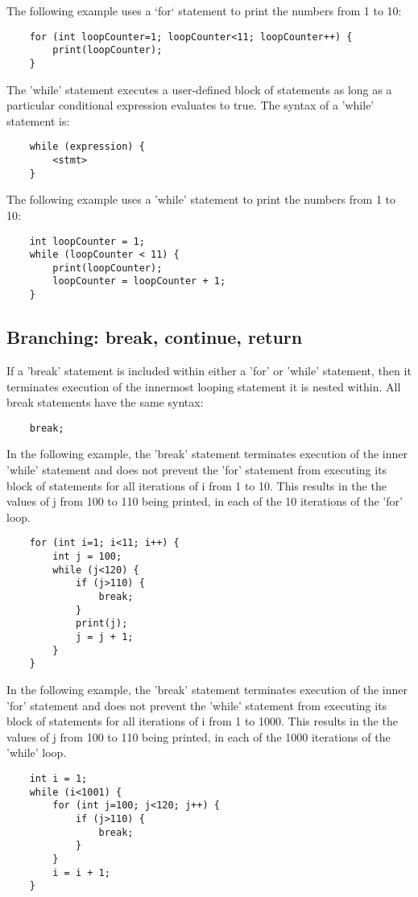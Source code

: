 \begin{homeworkProblem}
	
	The following example uses a `for` statement to print the numbers from 1 to 10:
	\begin{verbatim} 
	for (int loopCounter=1; loopCounter<11; loopCounter++) {
		print(loopCounter);
	}
	\end{verbatim}
	
	The 'while' statement executes a user-defined block of statements as long as a particular conditional expression evaluates to true. The syntax of a 'while' statement is:
	\begin{verbatim} 
	while (expression) {
		<stmt>
	}
	\end{verbatim}
	The following example uses a 'while' statement to print the numbers from 1 to 10:
	\begin{verbatim} 
	int loopCounter = 1;
	while (loopCounter < 11) {
		print(loopCounter);
		loopCounter = loopCounter + 1;
	}
	\end{verbatim}
	
	\subsection{Branching: break, continue, return}
	If a 'break' statement is included within either a 'for' or 'while' statement, then it  terminates execution of the innermost looping statement it is nested within. All break statements have the same syntax:
	\begin{verbatim} 
	break;
	\end{verbatim}
	
	In the following example, the 'break' statement terminates execution of the inner 'while' statement and does not prevent the 'for' statement from executing its block of statements for all iterations of i from 1 to 10. This results in the the values of j from 100 to 110 being printed, in each of the 10 iterations of the 'for' loop.
	\begin{verbatim} 
	for (int i=1; i<11; i++) {
		int j = 100;
		while (j<120) {
			if (j>110) {
				break;
			}
			print(j);
			j = j + 1;
		}
	}
	\end{verbatim}
	
	In the following example, the 'break' statement terminates execution of the inner 'for' statement and does not prevent the 'while' statement from executing its block of statements for all iterations of i from 1 to 1000. This results in the the values of j from 100 to 110 being printed, in each of the 1000 iterations of the 'while' loop.
	\begin{verbatim} 
	int i = 1;
	while (i<1001) {
		for (int j=100; j<120; j++) {
			if (j>110) {
				break;
			}
		}
		i = i + 1;
	}
	\end{verbatim}
	

\end{homeworkProblem}
